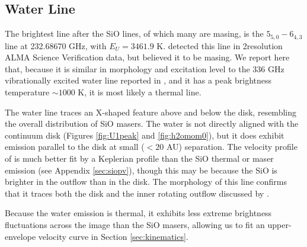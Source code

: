 \documentclass[twocolumn]{aastex61}
\begin{document}
\subsection{Water Line}
The brightest line after the SiO lines, of which many are masing, is the \water
$5_{5,0}-6_{4,3}$ line at 232.68670 GHz, with $E_U=3461.9$ K.
\citet{Hirota2012a} detected this line in 2\arcsec resolution ALMA Science
Verification data, but believed it to be masing.  We report here that, because
it is similar in morphology and excitation level to the 336 GHz vibrationally
excited water line reported in \citet{Hirota2014a}, and it has a peak
brightness temperature $\sim1000$ K, it is most likely a thermal line.

The water line traces an X-shaped feature above and below the disk, resembling
the overall distribution of SiO masers.  The water is not directly aligned with
the continuum disk (Figures \ref{fig:U1peak} and \ref{fig:h2omom0}), but it
does exhibit emission parallel to the disk at small ($<20$ AU) separation.  The
velocity profile of \water is much better fit by a Keplerian profile than the
SiO thermal or maser emission (see Appendix \ref{sec:siopv}), though this may
be because the SiO is brighter in the outflow than in the disk.
The morphology of this line confirms that it traces both the disk and
the inner rotating outflow discussed by \citet{Hirota2017b} \citep[see
also][]{Kim2008a,Matthews2010a}.


Because the water emission is thermal, it exhibits less extreme
brightness fluctuations across the image than the SiO masers, allowing us to
fit an upper-envelope velocity curve in Section \ref{sec:kinematics}.


\end{document}
